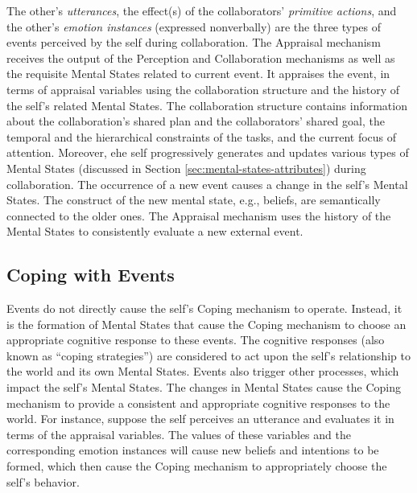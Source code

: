 \documentclass[12pt]{report}
\begin{document}
The other's \textit{utterances}, the effect(s) of the collaborators'
\textit{primitive actions}, and the other's \textit{emotion instances}
(expressed nonverbally) are the three types of events perceived by the self
during collaboration. The Appraisal mechanism receives the output of the
Perception and Collaboration mechanisms as well as the requisite Mental States
related to current event. It appraises the event, in terms of appraisal
variables using the collaboration structure and the history of the self's
related Mental States. The collaboration structure contains information about
the collaboration's shared plan and the collaborators' shared goal, the temporal
and the hierarchical constraints of the tasks, and the current focus of
attention. Moreover, ehe self progressively generates and updates various types
of Mental States (discussed in Section \ref{sec:mental-states-attributes})
during collaboration. The occurrence of a new event causes a change in the
self's Mental States. The construct of the new mental state, e.g., beliefs, are
semantically connected to the older ones. The Appraisal mechanism uses the
history of the Mental States to consistently evaluate a new external event.

\subsection{Coping with Events}

Events do not directly cause the self's Coping mechanism to operate. Instead, it
is the formation of Mental States that cause the Coping mechanism to choose an
appropriate cognitive response to these events. The cognitive responses (also
known as ``coping strategies'') are considered to act upon the self's
relationship to the world and its own Mental States. Events also trigger other
processes, which impact the self's Mental States. The changes in Mental States
cause the Coping mechanism to provide a consistent and appropriate cognitive
responses to the world. For instance, suppose the self perceives an utterance
and evaluates it in terms of the appraisal variables. The values of these
variables and the corresponding emotion instances will cause new beliefs and
intentions to be formed, which then cause the Coping mechanism to appropriately
choose the self's behavior.
\end{document}
